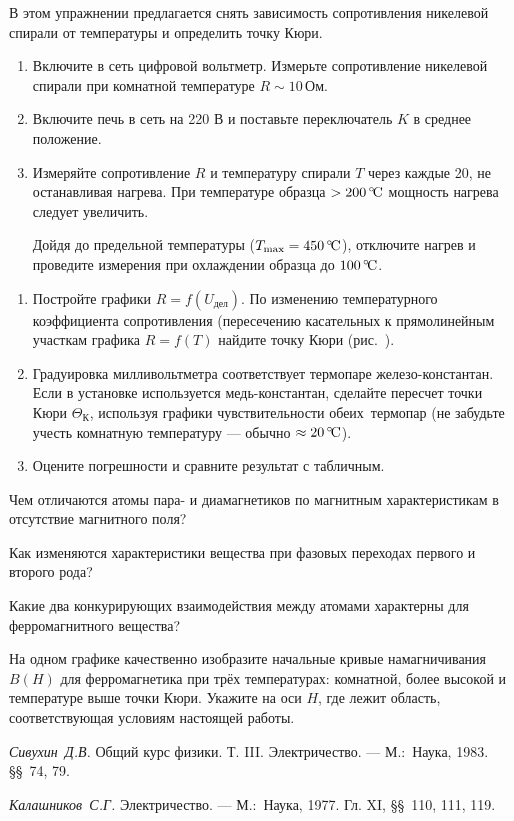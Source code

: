 \begin{lab:task}

В этом упражнении предлагается снять зависимость сопротивления никелевой
спирали от температуры и определить точку Кюри.

\begin{enumerate}
\item
  Включите в сеть цифровой вольтметр. Измерьте сопротивление никелевой спирали
при комнатной температуре $R \sim 10\,\text{Ом}$.
\item
  Включите печь в сеть на 220 В и поставьте переключатель $K$ в среднее
положение.
\item
  Измеряйте сопротивление $R$ и температуру спирали $T$ через каждые 20\oC,
  не останавливая нагрева. При температуре образца $>200\,^\circ\!\mathrm{C}$ мощность
нагрева следует увеличить.

Дойдя до предельной температуры ($T_\text{max} = 450\,^\circ\!\mathrm{C}$), отключите
нагрев и проведите измерения при охлаждении образца до $100\,^\circ\!\mathrm{C}$.
\end{enumerate}

\begin{enumerate}
\item
  Постройте графики $R = f(U_\text{дел})$. По изменению температурного
коэффициента сопротивления (пересечению касательных к прямолинейным участкам
графика $R = f(T)$ найдите точку Кюри (рис.~).
\item
  Градуировка милливольтметра соответствует термопаре железо-кон\-стантан. Если
в установке используется медь-константан, сделайте пересчет точки Кюри
$\Theta_{К}$, используя графики чувствительности \mbox{обеих тер}\-мопар (не
забудьте учесть комнатную температуру --- обычно $\approx20\,^\circ\!\mathrm{C}$).
\item
  Оцените погрешности и сравните результат с табличным.
\end{enumerate}
\end{lab:task}

\begin{lab:questions}

\item
  Чем отличаются атомы пара- и диамагнетиков по магнитным характеристикам в
отсутствие магнитного поля?
\item
  Как изменяются характеристики вещества при фазовых переходах первого и
второго рода?
\item
  Какие два конкурирующих взаимодействия между атомами характерны для
ферромагнитного вещества?
\item
  На одном графике качественно изобразите начальные кривые намагничивания
$B(H)$ для ферромагнетика при трёх температурах: комнатной, более высокой и
температуре выше точки Кюри. Укажите на оси $H$, где лежит область,
соответствующая условиям настоящей работы.

\end{lab:questions}

\begin{lab:literature}

\item \textit{Сивухин~Д.В.} Общий курс физики. Т. III. Электричество. --- М.:~Наука,
1983. \S\S~74, 79.
\item \textit{Калашников~С.Г.} Электричество. --- М.:~Наука, 1977. Гл. XI, \S\S~110,
111, 119.
\end{lab:literature}


